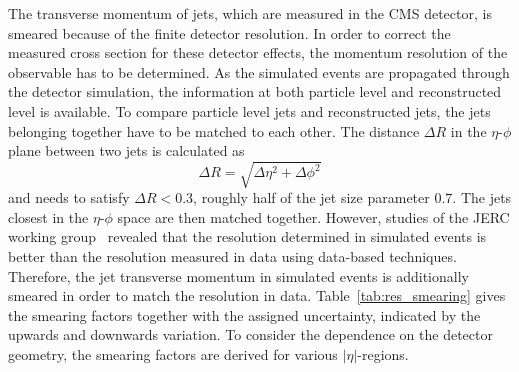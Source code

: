 The transverse momentum of jets, which are measured in the CMS detector, is
smeared because of the finite detector resolution. In order to correct the
measured cross section for these detector effects, the momentum resolution of
the observable has to be determined. As the simulated events are propagated
through the detector simulation, the information at both particle level and
reconstructed level is available. To compare particle level jets and
reconstructed jets, the jets belonging together have to be matched to each
other. The distance $\Delta R$ in the $\eta$-$\phi$ plane between two jets is
calculated as
%
\begin{equation}
\Delta R = \sqrt{\Delta \eta^2 + \Delta \phi^2}
\end{equation}
%
and needs to satisfy $\Delta R < 0.3$, roughly half of the jet size parameter
$0.7$. The jets closest in the $\eta$-$\phi$ space are then matched together.
However, studies of the \textsc{JERC} working group~\cite{jetmet:resolution}
revealed that the resolution determined in simulated events is better than the
resolution measured in data using data-based techniques. Therefore, the jet
transverse momentum in simulated events is additionally smeared in order to
match the resolution in data.  Table~\ref{tab:res_smearing} gives the smearing
factors together with the assigned uncertainty, indicated by the upwards and
downwards variation. To consider the dependence on the detector geometry, the
smearing factors are derived for various $|\eta|$-regions.

